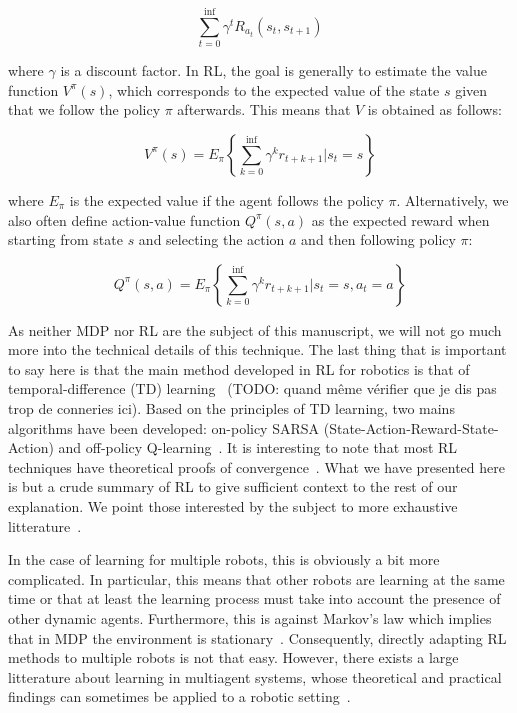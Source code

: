     \[
      \sum_{t=0}^{\inf} \gamma^{t}R_{a_{t}}(s_t,s_{t+1})
    \]

    where $\gamma$ is a discount factor. In RL, the goal is generally to estimate the value function $V^{\pi}(s)$, which corresponds to the expected value of the state $s$ given that we follow the policy $\pi$ afterwards. This means that $V$ is obtained as follows:

    \[
      V^{\pi}(s)=E_{\pi}\left\{\sum_{k=0}^{\inf} \gamma^k r_{t+k+1} | s_t = s \right\}
    \]

    where $E_{\pi}$ is the expected value if the agent follows the policy $\pi$. Alternatively, we also often define action-value function $Q^{\pi}(s,a)$ as the expected reward when starting from state $s$ and selecting the action $a$ and then following policy $\pi$:

    \[
      Q^{\pi}(s,a)=E_{\pi}\left\{\sum_{k=0}^{\inf} \gamma^k r_{t+k+1} | s_t = s, a_t = a \right\}
    \]

    As neither MDP nor RL are the subject of this manuscript, we will not go much more into the technical details of this technique. The last thing that is important to say here is that the main method developed in RL for robotics is that of temporal-difference (TD) learning~\parencite{Sutton1988, Bradtke1996} (TODO: quand même vérifier que je dis pas trop de conneries ici). Based on the principles of TD learning, two mains algorithms have been developed: on-policy SARSA (State-Action-Reward-State-Action) and off-policy Q-learning~\parencite{Watkins1989}. It is interesting to note that most RL techniques have theoretical proofs of convergence~\parencite{Panait2005}. What we have presented here is but a crude summary of RL to give sufficient context to the rest of our explanation. We point those interested by the subject to more exhaustive litterature~\parencite{Sutton1998, Deisenroth2011}.


    In the case of learning for multiple robots, this is obviously a bit more complicated. In particular, this means that other robots are learning at the same time or that at least the learning process must take into account the presence of other dynamic agents. Furthermore, this is against Markov's law which implies that in MDP the environment is stationary~\parencite{Littman1994, Parker2008}. Consequently, directly adapting RL methods to multiple robots is not that easy. However, there exists a large litterature about learning in multiagent systems, whose theoretical and practical findings can sometimes be applied to a robotic setting~\parencite{Stone2000, Yang2005, Panait2005}. 

